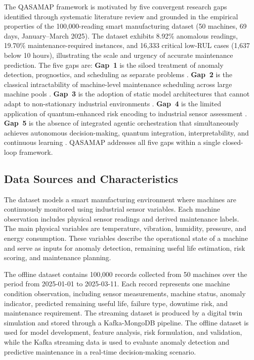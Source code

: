 The QASAMAP framework is motivated by five convergent research gaps identified through systematic literature review and grounded in the empirical properties of the 100,000-reading smart manufacturing dataset (50 machines, 69 days, January--March 2025). The dataset exhibits 8.92\% anomalous readings, 19.70\% maintenance-required instances, and 16,333 critical low-RUL cases (1,637 below 10 hours), illustrating the scale and urgency of accurate maintenance prediction. The five gaps are: \textbf{Gap~1} is the siloed treatment of anomaly detection, prognostics, and scheduling as separate problems \cite{Chalapathy2019, pang_deep_2021, Gao2022}. \textbf{Gap~2} is the classical intractability of machine-level maintenance scheduling across large machine pools \cite{Blekos2024, symons_practitioners_2023}. \textbf{Gap~3} is the adoption of static model architectures that cannot adapt to non-stationary industrial environments \cite{lee_autoencoder-based_2024}. \textbf{Gap~4} is the limited application of quantum-enhanced risk encoding to industrial sensor assessment \cite{kreplin_squlearn_2025}. \textbf{Gap~5} is the absence of integrated agentic orchestration that simultaneously achieves autonomous decision-making, quantum integration, interpretability, and continuous learning \cite{ouyang_llmsense_2024, xing_deepsqa_2021}. QASAMAP addresses all five gaps within a single closed-loop framework.

\subsection{Data Sources and Characteristics}

The dataset models a smart manufacturing environment where machines are continuously monitored using industrial sensor variables. Each machine observation includes physical sensor readings and derived maintenance labels. The main physical variables are temperature, vibration, humidity, pressure, and energy consumption. These variables describe the operational state of a machine and serve as inputs for anomaly detection, remaining useful life estimation, risk scoring, and maintenance planning.

The offline dataset contains 100,000 records collected from 50 machines over the period from 2025-01-01 to 2025-03-11. Each record represents one machine condition observation, including sensor measurements, machine status, anomaly indicator, predicted remaining useful life, failure type, downtime risk, and maintenance requirement. The streaming dataset is produced by a digital twin simulation and stored through a Kafka-MongoDB pipeline. The offline dataset is used for model development, feature analysis, risk formulation, and validation, while the Kafka streaming data is used to evaluate anomaly detection and predictive maintenance in a real-time decision-making scenario.

